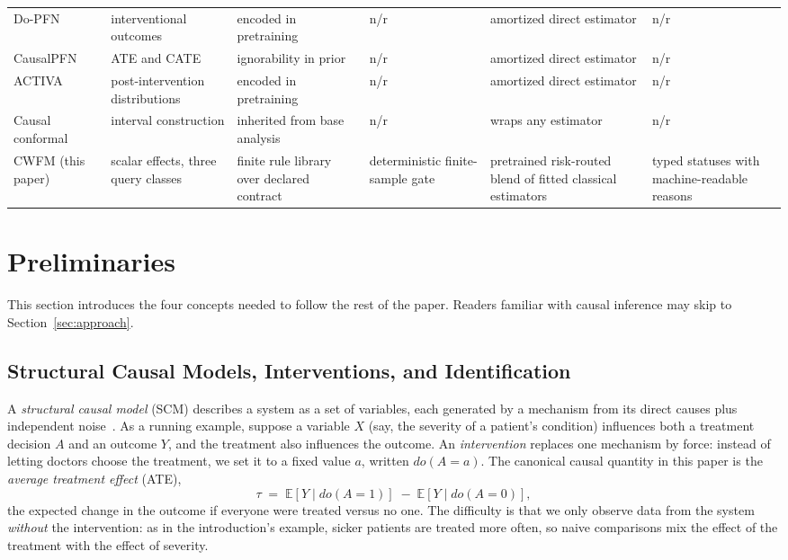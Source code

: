 \documentclass[electronics,article,submit,oneauthor]{Definitions/mdpi}
\begin{document}
\begin{table}[!t]
\begin{tabularx}{\textwidth}{>{\raggedright\arraybackslash}p{2.5cm}XXXXX}
Do-PFN~\cite{robertson2025dopfn} & interventional outcomes & encoded in pretraining & n/r & amortized direct estimator & n/r\\
CausalPFN~\cite{balazadeh2025causalpfn} & ATE and CATE & ignorability in prior & n/r & amortized direct estimator & n/r\\
ACTIVA~\cite{sauter2025activa} & post-intervention distributions & encoded in pretraining & n/r & amortized direct estimator & n/r\\
Causal conformal~\cite{lei2021conformal,causalguard2026} & interval construction & inherited from base analysis & n/r & wraps any estimator & n/r\\
CWFM (this paper) & scalar effects, three query classes & finite rule library over declared contract & deterministic finite-sample gate & pretrained risk-routed blend of fitted classical estimators & typed statuses with machine-readable reasons\\
\bottomrule
\end{tabularx}
\end{table}

\section{Preliminaries}\label{sec:preliminaries}

This section introduces the four concepts needed to follow the rest of the paper. Readers familiar with causal inference may skip to Section~\ref{sec:approach}.

\subsection{Structural Causal Models, Interventions, and Identification}\label{sec:prelim-scm}

A \emph{structural causal model} (SCM) describes a system as a set of variables, each generated by a mechanism from its direct causes plus independent noise~\cite{pearl2009causality}. As a running example, suppose a variable $X$ (say, the severity of a patient's condition) influences both a treatment decision $A$ and an outcome $Y$, and the treatment also influences the outcome. An \emph{intervention} replaces one mechanism by force: instead of letting doctors choose the treatment, we set it to a fixed value $a$, written $do(A=a)$. The canonical causal quantity in this paper is the \emph{average treatment effect} (ATE),
\begin{equation}
\tau \;=\; \mathbb{E}\!\left[Y \mid do(A=1)\right] \;-\; \mathbb{E}\!\left[Y \mid do(A=0)\right],
\end{equation}
the expected change in the outcome if everyone were treated versus no one. The difficulty is that we only observe data from the system \emph{without} the intervention: as in the introduction's example, sicker patients are treated more often, so naive comparisons mix the effect of the treatment with the effect of severity.
\end{document}
